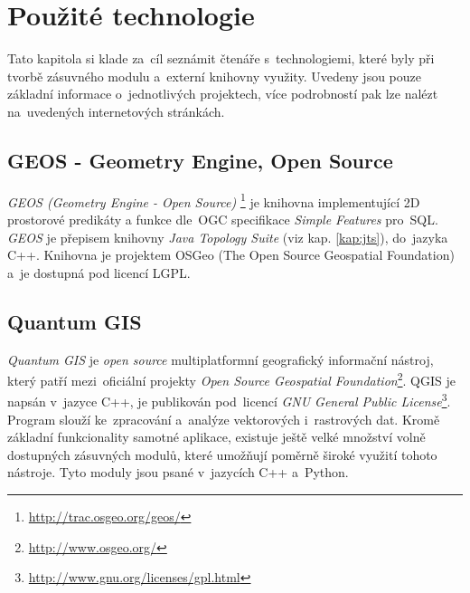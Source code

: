 \chapter{Použité technologie}
\label{4-technologie}

Tato kapitola si klade za~cíl seznámit čtenáře s~technologiemi, které byly 
při tvorbě zásuvného modulu a~externí knihovny využity. Uvedeny jsou pouze
základní informace o~jednotlivých projektech, více podrobností pak lze
nalézt na~uvedených internetových stránkách.


\section{GEOS - Geometry Engine, Open Source}
\label{geos}

\textit{GEOS (Geometry Engine - Open Source)}
\footnote{\url{http://trac.osgeo.org/geos/}} 
je knihovna implementující 2D prostorové predikáty a funkce dle~OGC 
specifikace \textit{Simple Features} pro~SQL. \textit{GEOS} je přepisem 
knihovny \textit{Java Topology Suite} (viz kap. \ref{kap:jts}), do~jazyka 
C++. Knihovna je projektem OSGeo (The Open Source Geospatial Foundation) 
a~je dostupná pod licencí LGPL.

% 

\section{Quantum GIS}
\label{qgis}

\textit{Quantum GIS} je \textit{open source} multiplatformní geografický 
informační nástroj, který patří mezi~oficiální projekty \textit{Open Source 
Geospatial Foundation}\footnote{\url{http://www.osgeo.org/}}. QGIS je 
napsán v~jazyce C++, je publikován pod~licencí \textit{GNU General Public 
License}\footnote{\url{http://www.gnu.org/licenses/gpl.html}}. Program slouží 
ke~zpracování a~analýze vektorových i~rastrových dat. Kromě základní 
funkcionality samotné aplikace, existuje ještě velké množství volně 
dostupných zásuvných modulů, které umožňují poměrně široké využití 
tohoto nástroje. Tyto moduly jsou psané v~jazycích C++ a~Python.


